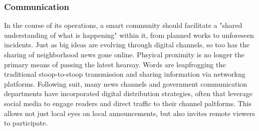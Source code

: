 


\subsubsection{Communication}
In the course of its operations, a smart community should facilitate a "shared understanding of what is happening" within it\cite{Rivera2020},%
from planned works to unforeseen incidents. Just as big ideas are evolving through digital channels, so too has the sharing of neighborhood news gone online. Phsyical proximity is no longer the primary means of passing the latest hearsay. Words are leapfrogging the traditional stoop-to-stoop transmission and sharing information via networkng platforms\cite{Evans-Cowley2010}. %
Following suit, many news channels and government communication departments have incorporated digital distribution strategies, often that leverage social media to engage readers and direct traffic to their channel paltforms. This allows not just local eyes on local announcements, but also invites remote viewers to participate\cite{Evans-Cowley2010}. %

